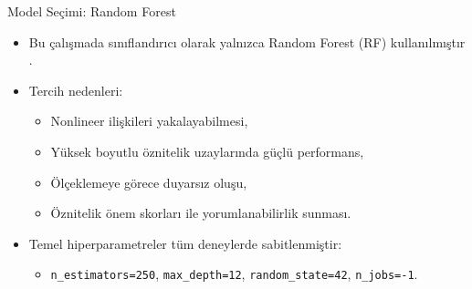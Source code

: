 \documentclass[aspectratio=169]{beamer}
\begin{document}
\begin{frame}{Model Seçimi: Random Forest}
	\begin{itemize}
		\item Bu çalışmada sınıflandırıcı olarak yalnızca Random Forest (RF) kullanılmıştır \cite{breiman2001-rf}.
		\item Tercih nedenleri:
		\begin{itemize}
			\item Nonlineer ilişkileri yakalayabilmesi,
			\item Yüksek boyutlu öznitelik uzaylarında güçlü performans,
			\item Ölçeklemeye görece duyarsız oluşu,
			\item Öznitelik önem skorları ile yorumlanabilirlik sunması.
		\end{itemize}
		\item Temel hiperparametreler tüm deneylerde sabitlenmiştir:
		\begin{itemize}
			\item \texttt{n\_estimators=250}, \texttt{max\_depth=12}, \texttt{random\_state=42}, \texttt{n\_jobs=-1}.
		\end{itemize}
	\end{itemize}
\end{frame}
\end{document}
